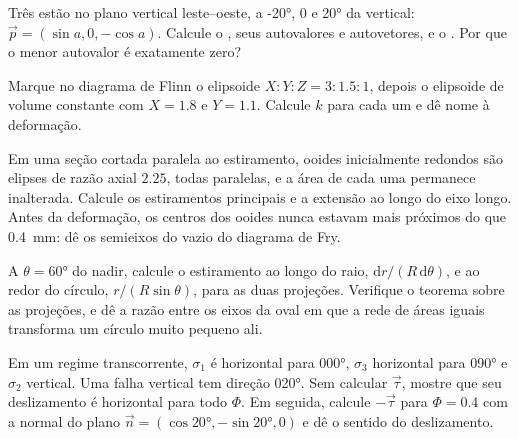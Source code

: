 \begin{exercise}[$\star\star$]\label{exo:b3:structural-analysis:7}
Três  estão no plano vertical leste--oeste, a \ang{-20}, $0$ e
\ang{20} da vertical: $\vec p = (\sin a, 0, -\cos a)$. Calcule o ,
seus autovalores e autovetores, e o . Por que o menor autovalor é exatamente
zero?
\end{exercise}

\begin{exercise}[$\star\star$]\label{exo:b3:structural-analysis:8}
Marque no diagrama de Flinn o elipsoide $X : Y : Z = 3 : 1.5 : 1$, depois o elipsoide de
volume constante com $X = 1.8$ e $Y = 1.1$. Calcule $k$ para cada um e dê nome à
deformação.
\end{exercise}

\begin{exercise}[$\star\star$]\label{exo:b3:structural-analysis:9}
Em uma seção cortada paralela ao estiramento, ooides inicialmente redondos são
elipses de razão axial $2.25$, todas paralelas, e a área de cada uma permanece
inalterada. Calcule os estiramentos principais e a extensão ao longo do eixo longo.
Antes da deformação, os centros dos ooides nunca estavam mais próximos do que
\qty{0.4}{mm}: dê os semieixos do vazio do diagrama de Fry.
\end{exercise}

\begin{exercise}[$\star\star\star$]\label{exo:b3:structural-analysis:10}
A $\theta = \ang{60}$ do nadir, calcule o estiramento ao longo do raio,
$\mathrm dr/(R\,\mathrm d\theta)$, e ao redor do círculo, $r/(R\sin\theta)$,
para as duas projeções. Verifique o teorema sobre as projeções, e dê a razão entre
os eixos da oval em que a rede de áreas iguais transforma um círculo muito pequeno
ali.
\end{exercise}

\begin{exercise}[$\star\star\star$]\label{exo:b3:structural-analysis:11}
Em um regime transcorrente, $\sigma_1$ é horizontal para \ang{000},
$\sigma_3$ horizontal para \ang{090} e $\sigma_2$ vertical. Uma falha vertical tem
direção \ang{020}. Sem calcular $\vec\tau$, mostre que seu deslizamento é
horizontal para todo $\Phi$. Em seguida, calcule $-\vec\tau$ para $\Phi = 0.4$ com
a normal do plano $\vec n = (\cos\ang{20}, -\sin\ang{20}, 0)$ e dê o sentido do
deslizamento.
\end{exercise}

